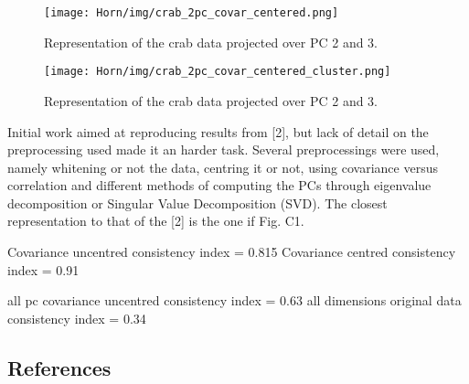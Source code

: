 \documentclass[10pt,a4paper,final]{article}
\begin{document}
\begin{figure}[hbtp]
\centering
\texttt{[image: Horn/img/crab\_2pc\_covar\_centered.png]}
\caption{Representation of the crab data projected over PC 2 and 3.}
\label{fig:crab_2pc_covar_centered}
\end{figure}

\begin{figure}[hbtp]
\centering
\texttt{[image: Horn/img/crab\_2pc\_covar\_centered\_cluster.png]}
\caption{Representation of the crab data projected over PC 2 and 3.}
\label{fig:crab_2pc_covar_centered_cluster}
\end{figure}


Initial work aimed at reproducing results from [2], but lack of detail on the preprocessing used made it an harder task. Several preprocessings were used, namely whitening or not the data, centring it or not, using covariance versus correlation and different methods of computing the PCs through eigenvalue decomposition or Singular Value Decomposition (SVD). The closest representation to that of the [2] is the one if Fig. C1.




Covariance uncentred consistency index = 0.815
Covariance centred consistency index = 0.91

all pc covariance uncentred consistency index = 0.63
all dimensions original data consistency index = 0.34



\subsection{References}
%
%
%
%
\end{document}
